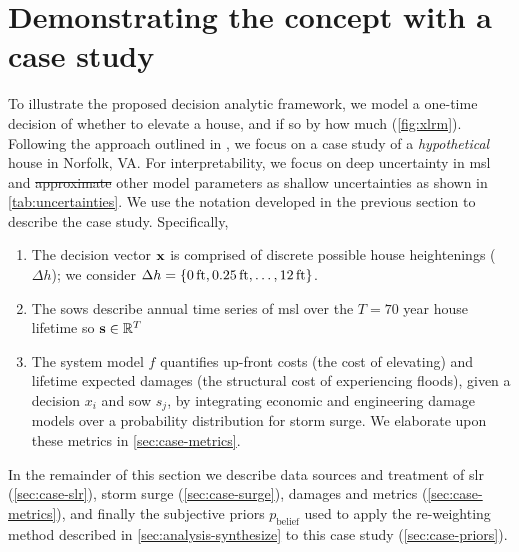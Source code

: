 \documentclass{agujournal2019}
\providecommand{\DIFadd}[1]{{\protect\color{blue}\uwave{#1}}} %
\providecommand{\DIFdel}[1]{{\protect\color{red}\sout{#1}}}                      %
\providecommand{\DIFaddbegin}{} %
\providecommand{\DIFaddend}{} %
\providecommand{\DIFdelbegin}{} %
\providecommand{\DIFdelend}{} %
\newcommand{\DIFscaledelfig}{0.5}
\newlength{\DIFdelgraphicswidth} %
\newlength{\DIFdelgraphicsheight} %
\newcommand{\DIFaddincludegraphics}[2][]{{\color{blue}\fbox{\DIFOincludegraphics[#1]{#2}}}} %
\newcommand{\DIFdelincludegraphics}[2][]{%
\sbox{\DIFdelgraphicsbox}{\DIFOincludegraphics[#1]{#2}}%
\settoboxwidth{\DIFdelgraphicswidth}{\DIFdelgraphicsbox} %
\settoboxtotalheight{\DIFdelgraphicsheight}{\DIFdelgraphicsbox} %
\scalebox{\DIFscaledelfig}{%
\parbox[b]{\DIFdelgraphicswidth}{\usebox{\DIFdelgraphicsbox}\\[-\baselineskip] \rule{\DIFdelgraphicswidth}{0em}}\llap{\resizebox{\DIFdelgraphicswidth}{\DIFdelgraphicsheight}{%
\setlength{\unitlength}{\DIFdelgraphicswidth}%
\begin{picture}(1,1)%
\thicklines\linethickness{2pt} %
{\color[rgb]{1,0,0}\put(0,0){\framebox(1,1){}}}%
{\color[rgb]{1,0,0}\put(0,0){\line( 1,1){1}}}%
{\color[rgb]{1,0,0}\put(0,1){\line(1,-1){1}}}%
\end{picture}%
}\hspace*{3pt}}} %
} %
\DeclareRobustCommand{\DIFaddbegin}{\DIFOaddbegin \let\includegraphics\DIFaddincludegraphics} %
\DeclareRobustCommand{\DIFaddend}{\DIFOaddend \let\includegraphics\DIFOincludegraphics} %
\DeclareRobustCommand{\DIFdelbegin}{\DIFOdelbegin \let\includegraphics\DIFdelincludegraphics} %
\DeclareRobustCommand{\DIFdelend}{\DIFOaddend \let\includegraphics\DIFOincludegraphics} %
\begin{document}
\DIFaddend \section{Demonstrating the concept with a case study}\label{sec:case-study}

To illustrate the proposed decision analytic framework, we model a one-time decision of whether to elevate a house, and if so by how much (\cref{fig:xlrm}).
Following the approach outlined in , we focus on a case study of a \emph{hypothetical} house in Norfolk, VA.
For interpretability, we focus on deep uncertainty in \gls{msl} and \DIFdelbegin \DIFdel{approximate }\DIFdelend \DIFaddbegin \DIFadd{treat storm surge and }\DIFaddend other model parameters as shallow uncertainties as shown in \cref{tab:uncertainties}.
We use the notation developed in the previous section to describe the case study.
Specifically,
\begin{enumerate}
  \item The decision vector $\vb{x}$ is comprised of discrete possible house heightenings ($\Delta h$); we consider $\Delta h = \qty{\SI{0}{ft}, \SI{0.25}{ft}, \ldots, \SI{12}{ft}}$.
  \item The \glspl{sow} describe annual time series of \gls{msl} over the $T=70$ year house lifetime so $\vb{s} \in \mathbb{R}^T$
  \item The system model $f$ quantifies up-front costs (the cost of elevating) and lifetime expected damages (the structural cost of experiencing floods), given a decision $x_i$ and \gls{sow} $s_j$, by integrating economic and engineering damage models over a probability distribution for storm surge. We elaborate upon these metrics in \cref{sec:case-metrics}.
\end{enumerate}
In the remainder of this section we describe data sources and treatment of \gls{slr} (\cref{sec:case-slr}), storm surge (\cref{sec:case-surge}), damages and metrics (\cref{sec:case-metrics}), and finally the subjective priors $p_\mathrm{belief}$ used to apply the re-weighting method described in \cref{sec:analysis-synthesize} to this case study (\cref{sec:case-priors}).
\end{document}
